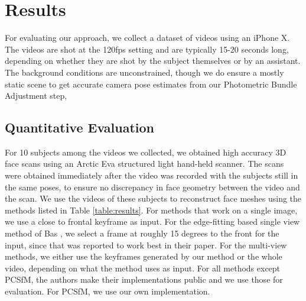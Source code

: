 \documentclass[10pt,twocolumn,letterpaper]{article}
\begin{document}




\section{Results}

For evaluating our approach, we collect a dataset of videos using an iPhone X. The videos are shot at the 120fps setting and are typically 15-20 seconds long, depending on whether they are shot by the subject themselves or by an assistant. The background conditions are unconstrained, though we do ensure a mostly static scene to get accurate camera pose estimates from our Photometric Bundle Adjustment step,

\subsection{Quantitative Evaluation} \label{sec:quant}

For 10 subjects among the videos we collected, we obtained high accuracy 3D face scans using an Arctic Eva structured light hand-held scanner. The scans were obtained immediately after the video was recorded with the subjects still in the same poses, to ensure no discrepancy in face geometry between the video and the scan. We use the videos of these subjects to reconstruct face meshes using the methods listed in Table \ref{table:results}. For methods that work on a single image, we use a close to frontal keyframe as input. For the edge-fitting based single view method of Bas \etal \cite{bas2016fitting}, we select a frame at roughly 15 degrees to the front for the input, since that was reported to work best in their paper. For the multi-view methods, we either use the keyframes generated by our method or the whole video, depending on what the method uses as input.
For all methods except PCSfM, the authors make their implementations public and we use those for evaluation. For PCSfM, we use our own implementation.
\end{document}

